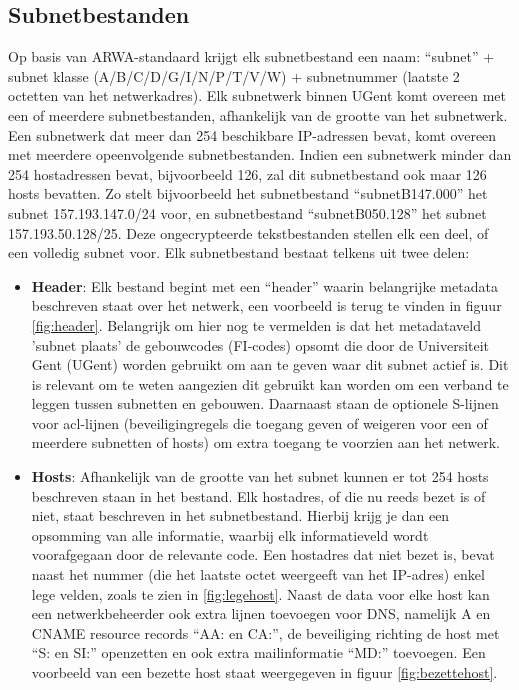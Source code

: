 \subsection{Subnetbestanden}
\label{subnetbestanden}
Op basis van ARWA-standaard krijgt elk subnetbestand een naam: “subnet” + subnet klasse (A/B/C/D/G/I/N/P/T/V/W) + subnetnummer (laatste 2 octetten van het netwerkadres). Elk subnetwerk binnen UGent komt overeen met een of meerdere subnetbestanden, afhankelijk van de grootte van het subnetwerk. Een subnetwerk dat meer dan 254 beschikbare IP-adressen bevat, komt overeen met meerdere opeenvolgende subnetbestanden. Indien een subnetwerk minder dan 254 hostadressen bevat, bijvoorbeeld 126, zal dit subnetbestand ook maar 126 hosts bevatten.
Zo stelt bijvoorbeeld het subnetbestand “subnetB147.000” het subnet 157.193.147.0/24 voor, en subnetbestand “subnetB050.128” het subnet 157.193.50.128/25. Deze ongecrypteerde tekstbestanden stellen elk een deel, of een volledig subnet voor. Elk subnetbestand bestaat telkens uit twee delen: 
\begin{itemize}
    \item \textbf{Header}: Elk bestand begint met een “header” waarin belangrijke metadata beschreven staat over het netwerk, een voorbeeld is terug te vinden in figuur \ref{fig:header}. Belangrijk om hier nog te vermelden is dat het metadataveld 'subnet plaats' de gebouwcodes (FI-codes) opsomt die door de Universiteit Gent (UGent) worden gebruikt om aan te geven waar dit subnet actief is. Dit is relevant om te weten aangezien dit gebruikt kan worden om een verband te leggen tussen subnetten en gebouwen. Daarnaast staan de optionele S-lijnen voor \acrfull{acl}-lijnen (beveiligingregels die toegang geven of weigeren voor een of meerdere subnetten of hosts) om extra toegang te voorzien aan het netwerk. 
    \item \textbf{Hosts}: Afhankelijk van de grootte van het subnet kunnen er tot 254 hosts beschreven staan in het bestand. Elk hostadres, of die nu reeds bezet is of niet, staat beschreven in het subnetbestand. Hierbij krijg je dan een opsomming van alle informatie, waarbij elk informatieveld wordt voorafgegaan door de relevante code. Een hostadres dat niet bezet is, bevat naast het nummer (die het laatste octet weergeeft van het IP-adres) enkel lege velden, zoals te zien in \ref{fig:legehost}. Naast de data voor elke host kan een netwerkbeheerder ook extra lijnen toevoegen voor DNS, namelijk A en CNAME resource records “AA: en CA:”, de beveiliging richting de host met “S: en SI:” openzetten en ook extra mailinformatie “MD:” toevoegen. Een voorbeeld van een bezette host staat weergegeven in figuur \ref{fig:bezettehost}.
\end{itemize}

